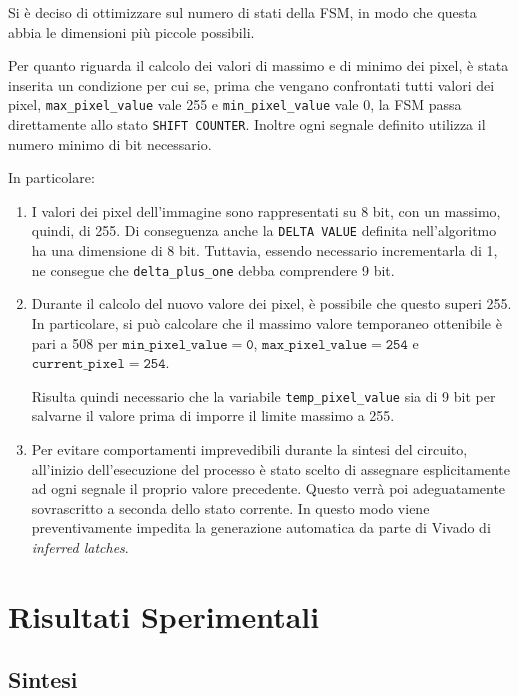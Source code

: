\documentclass[11pt]{article}
\begin{document}
    Si è deciso di ottimizzare sul numero di stati della FSM, in modo che questa abbia le dimensioni più piccole possibili. 
    
    Per quanto riguarda il calcolo dei valori di massimo e di minimo dei pixel, è stata inserita un condizione per cui se, prima che vengano confrontati tutti valori dei pixel, \texttt{max\_pixel\_value} vale 255 e \texttt{min\_pixel\_value} vale 0, la FSM passa direttamente allo stato \texttt{SHIFT COUNTER}.
    \newpage
    Inoltre ogni segnale definito utilizza il numero minimo di bit necessario.
    
    In particolare:
    \begin{enumerate}
        \item I valori dei pixel dell'immagine sono rappresentati su 8 bit, con un massimo, quindi, di 255. Di conseguenza anche la \texttt{DELTA VALUE} definita nell'algoritmo ha una dimensione di 8 bit. Tuttavia, essendo necessario incrementarla di 1, ne consegue che \texttt{delta\_plus\_one} debba comprendere 9 bit.
        
        \item Durante il calcolo del nuovo valore dei pixel, è possibile che questo superi 255. In particolare, si può calcolare che il massimo valore temporaneo ottenibile è pari a 508 per $\mathtt{min\_pixel\_value = 0}$, $\mathtt{max\_pixel\_value = 254}$ e $\mathtt{current\_pixel = 254}$.
        
        Risulta quindi necessario che la variabile \texttt{temp\_pixel\_value} sia di 9 bit per salvarne il valore prima di imporre il limite massimo a 255.
        
        \item Per evitare comportamenti imprevedibili durante la sintesi del circuito, all'inizio dell'esecuzione del processo è stato scelto di assegnare esplicitamente ad ogni segnale il proprio valore precedente.
        Questo verrà poi adeguatamente sovrascritto a seconda dello stato corrente.
        In questo modo viene preventivamente impedita la generazione automatica da parte di Vivado di \emph{inferred latches}.
        
    \end{enumerate}
\newpage
\section{Risultati Sperimentali}

    \subsection{Sintesi}
    
\end{document}
